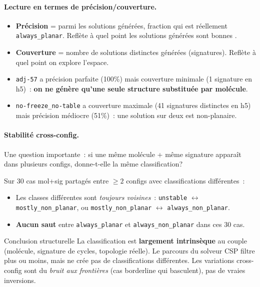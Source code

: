 \documentclass[11pt,a4paper]{article}
\begin{document}
\paragraph{Lecture en termes de précision/couverture.}
\begin{itemize}[leftmargin=2em,itemsep=0.2em]
  \item \textbf{Précision} = parmi les solutions générées, fraction qui est réellement \texttt{always\_planar}. Reflète à quel point les solutions générées sont \og bonnes \fg{}.
  \item \textbf{Couverture} = nombre de solutions distinctes générées (signatures). Reflète à quel point on explore l'espace.
  \item \texttt{adj-57} a précision parfaite (100\%) mais couverture minimale (1 signature en h5)~: \textbf{on ne génère qu'une seule structure substituée par molécule}.
  \item \texttt{no-freeze\_no-table} a couverture maximale (41 signatures distinctes en h5) mais précision médiocre (51\%)~: une solution sur deux est non-planaire.
\end{itemize}

\paragraph{Stabilité cross-config.}
Une question importante~: si une même molécule + même signature apparaît dans plusieurs configs, donne-t-elle la même classification?

Sur 30 cas mol+sig partagés entre $\geq 2$ configs avec classifications différentes~:
\begin{itemize}[leftmargin=2em,itemsep=0.2em]
  \item Les classes différentes sont \emph{toujours voisines}~: \texttt{unstable} $\leftrightarrow$ \texttt{mostly\_non\_planar}, ou \texttt{mostly\_non\_planar} $\leftrightarrow$ \texttt{always\_non\_planar}.
  \item \textbf{Aucun saut} entre \texttt{always\_planar} et \texttt{always\_non\_planar} dans ces 30 cas.
\end{itemize}

\begin{encadre}{Conclusion structurelle}
La classification est \textbf{largement intrinsèque} au couple (molécule, signature de cycles, topologie réelle). Le parcours du solveur CSP filtre plus ou moins, mais ne crée pas de classifications différentes. Les variations cross-config sont du \emph{bruit aux frontières} (cas borderline qui basculent), pas de vraies inversions.
\end{encadre}
\end{document}
